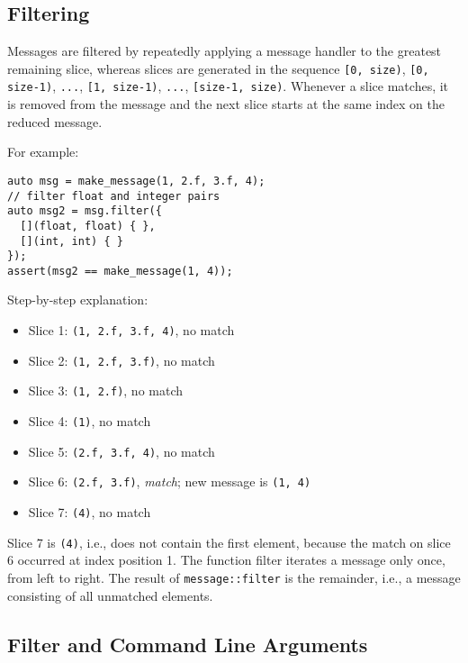 \clearpage
\subsection{Filtering}
\label{Sec::Messages::Filter}

Messages are filtered by repeatedly applying a message handler to the greatest remaining slice, whereas slices are generated in the sequence \lstinline^[0, size)^, \lstinline^[0, size-1)^, \lstinline^...^, \lstinline^[1, size-1)^, \lstinline^...^, \lstinline^[size-1, size)^.
Whenever a slice matches, it is removed from the message and the next slice starts at the same index on the reduced message.

For example:

\begin{lstlisting}
auto msg = make_message(1, 2.f, 3.f, 4);
// filter float and integer pairs
auto msg2 = msg.filter({
  [](float, float) { },
  [](int, int) { }
});
assert(msg2 == make_message(1, 4));
\end{lstlisting}

Step-by-step explanation:

\begin{itemize}
  \item Slice 1: \lstinline^(1, 2.f, 3.f, 4)^, no match
  \item Slice 2: \lstinline^(1, 2.f, 3.f)^, no match
  \item Slice 3: \lstinline^(1, 2.f)^, no match
  \item Slice 4: \lstinline^(1)^, no match
  \item Slice 5: \lstinline^(2.f, 3.f, 4)^, no match
  \item Slice 6: \lstinline^(2.f, 3.f)^, \emph{match}; new message is \lstinline^(1, 4)^
  \item Slice 7: \lstinline^(4)^, no match
\end{itemize}

Slice 7 is \lstinline^(4)^, i.e., does not contain the first element, because the match on slice 6 occurred at index position 1. The function filter iterates a message only once, from left to right. The result of \lstinline^message::filter^ is the remainder, i.e., a message consisting of all unmatched elements.

\clearpage
\subsection{Filter and Command Line Arguments}
\label{Sec::Messages::FilterCLI}

